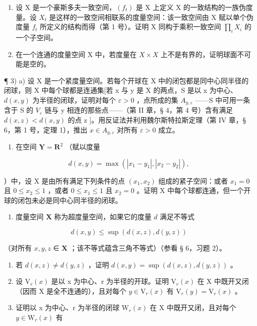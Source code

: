 \ExerciseSection

\begin{enumerate}
\def\labelenumi{\arabic{enumi})}
\item
  设 X 是一个豪斯多夫一致空间，\((f_{t})\) 是 X 上定义 X 的一致结构的一族伪度量。设 \(X_{t}\) 是这样的一致空间相联系的度量空间：该一致空间由 X 赋以单个伪度量 \(f_{t}\) 所定义的结构而得（第 1 号）。证明 X 同构于乘积一致空间 \(\prod_{i} X_{i}\) 的一个子空间。
\item
  在一个连通的度量空间 X 中，若度量在 \(X \times X\) 上不是有界的，证明球面不可能是空的。
\end{enumerate}

¶ 3) a) 设 X 是一个紧度量空间。若每个开球在 X 中的闭包都是同中心同半径的闭球，则 X 中每个球都是连通集{[}若 x 与 y 是 X 的两点，S 是以 x 为中心、\(d(x, y)\) 为半径的闭球，证明对每个 \(\varepsilon > 0\) ，点所成的集 \(A_{y,\varepsilon}\) ——S 中可用一条含于 S 的 \(V_{\varepsilon}\) 链与 y 相连的那些点——（第 II 章，§ 4，第 4 号）含有满足 \(d(x, z) < d(x, y)\) 的点 z {]}。用反证法并利用魏尔斯特拉斯定理（第 IV 章，§ 6，第 1 号，定理 1），推出 \(x \in A_{y,\varepsilon}\) 对所有 \(\varepsilon > 0\) 成立。

\begin{enumerate}
\def\labelenumi{\alph{enumi})}
\setcounter{enumi}{1}
\tightlist
\item
  在空间 \(\mathbf{Y} = \mathbf{R}^2\) （赋以度量
\end{enumerate}

\[
d (x, y) = \max \left(\left| x _ {1} - y _ {1} \right|, \left| x _ {2} - y _ {2} \right|\right),
\]

）中，设 X 是由所有满足下列条件的点 \((x_{1}, x_{2})\) 组成的紧子空间：或者 \(x_{1} = 0\) 且 \(0 \leqslant x_{2} \leqslant 1\) ，或者 \(0 \leqslant x_{1} \leqslant 1\) 且 \(x_{2} = 0\) 。证明 X 中每个球都连通，但一个开球的闭包未必是同中心同半径的闭球。

\begin{enumerate}
\def\labelenumi{\arabic{enumi})}
\setcounter{enumi}{3}
\tightlist
\item
  度量空间 \(\mathbf{X}\) 称为超度量空间，如果它的度量 \(d\) 满足不等式
\end{enumerate}

\[
d (x, y) \leqslant \sup \left(d (x, z), d (y, z)\right)
\]

（对所有 \(x, y, z\) ∈ \(\mathbf{X}\) ；该不等式蕴含三角不等式）（参看 § 6，习题 2）。

\begin{enumerate}
\def\labelenumi{\alph{enumi})}
\item
  若 \(d(x, z) \neq d(y, z)\) ，证明 \(d(x, y) = \sup (d(x, z), d(y, z))\) 。
\item
  设 \(\mathrm{V}_{r}(x)\) 是以 x 为中心、r 为半径的开球。证明 \(\mathrm{V}_{r}(x)\) 在 X 中既开又闭（因而 X 是全不连通的），且对每个 \(y \in \mathrm{V}_{r}(x)\) 有 \(\mathrm{V}_{r}(y) = \mathrm{V}_{r}(x)\) 。
\item
  证明以 x 为中心、r 为半径的闭球 \(\mathrm{W}_{r}(x)\) 在 X 中既开又闭，且对每个 \(y \in \mathrm{W}_{r}(x)\) 有
\end{enumerate}

